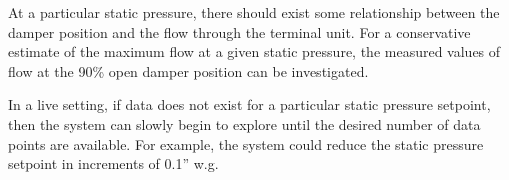 At a particular static pressure, there should exist some relationship between the damper position and the flow through the terminal unit. For a conservative estimate of the maximum flow at a given static pressure, the measured values of flow at the 90\% open damper position can be investigated. 

In a live setting, if data does not exist for a particular static pressure setpoint, then the system can slowly begin to explore until the desired number of data points are available. For example, the system could reduce the static pressure setpoint in increments of 0.1'' w.g. 




%
%
%
%
%
%
%
%

